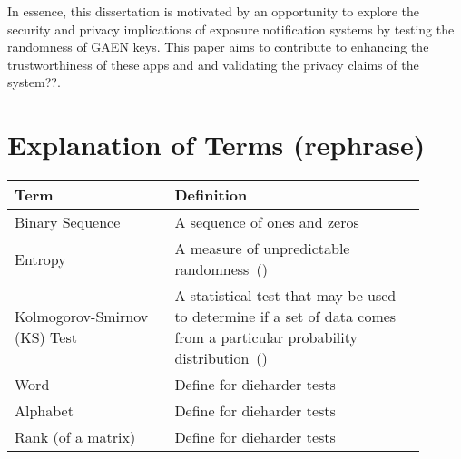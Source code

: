 In essence, this dissertation is motivated by an opportunity to explore the security and privacy implications of exposure notification systems by testing the randomness of GAEN keys. This paper aims to contribute to enhancing the trustworthiness of these apps and and validating the privacy claims of the system??.  



\section{Explanation of Terms (rephrase)}

\begin{table}[htbp]
\begin{tabular}{|p{0.35\linewidth}|p{0.55\linewidth}|}
\hline
\textbf{Term}               & \textbf{Definition}                                                                                               \\ \hline
Binary Sequence             & A sequence of ones and zeros                                                                                      \\ \hline
Entropy                     & A measure of unpredictable randomness~(\cite{zolfaghari2022odyssey})                                              \\ \hline
Kolmogorov-Smirnov (KS) Test    & A statistical test that may be used to determine if a set of data comes from a particular probability distribution~(\cite{nist}) \\ \hline
Word                        & Define for dieharder tests                                                                                         \\ \hline
Alphabet                    & Define for dieharder tests                                                                                         \\ \hline
Rank (of a matrix)         & Define for dieharder tests                                                                                         \\ \hline
\end{tabular}
\end{table}
